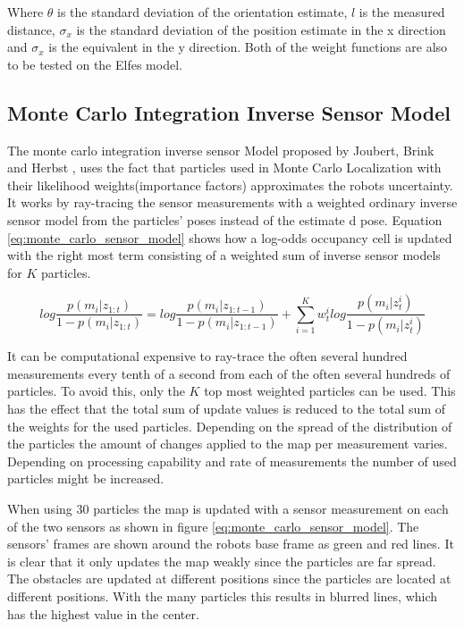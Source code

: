 Where \(\theta \) is the standard deviation of the orientation estimate, \(l\) is the measured distance, \(\sigma_x\) is the standard deviation of the position estimate in the x direction and \(\sigma_x\) is the equivalent in the y direction.
Both of the weight functions are also to be tested on the Elfes model.

\subsection{Monte Carlo Integration Inverse Sensor Model}
\label{monte_carlo_sensor Model}
The monte carlo integration inverse sensor Model proposed by Joubert, Brink and Herbst \cite{Joubert2014},  uses the fact that particles used in Monte Carlo Localization with their likelihood weights(importance factors) approximates the robots uncertainty. 
It works by ray-tracing the sensor measurements with a weighted ordinary inverse sensor model from the particles' poses instead of the estimate d pose. 
Equation \vref{eq:monte_carlo_sensor_model} shows how a log-odds occupancy cell is updated with the right most term consisting of a weighted sum of inverse sensor models for $K$ particles.

\begin{equation}
log \frac{p(m_i|z_{1:t})}{1-p(m_i|z_{1:t})} = log \frac{p(m_i|z_{1:t-1})}{1-p(m_i|z_{1:t-1})} + \sum_{i=1}^{K} w_t^i log \frac{ p(m_i | z_t^i) }{ 1 - p(m_i | z_t^i) }
\label{eq:monte_carlo_sensor_model}
\end{equation}

It can be computational expensive to ray-trace the often several hundred measurements every tenth of a second from each of the often several hundreds of particles.
To avoid this, only the $K$ top most weighted particles can be used. 
This has the effect that the total sum of update values is reduced to the total sum of the weights for the used particles.
Depending on the spread of the distribution of the particles the amount of changes applied to the map per measurement varies.
Depending on processing capability and rate of measurements the number of used particles might be increased.

When using $30$ particles the map is updated with a sensor measurement on each of the two sensors as shown in figure \vref{eq:monte_carlo_sensor_model}.
The sensors' frames are shown around the robots base frame as green and red lines.
It is clear that it only updates the map weakly since the particles are far spread. 
The obstacles are updated at different positions since the particles are located at different positions. With the many particles this results in blurred lines, which has the highest value in the center.

